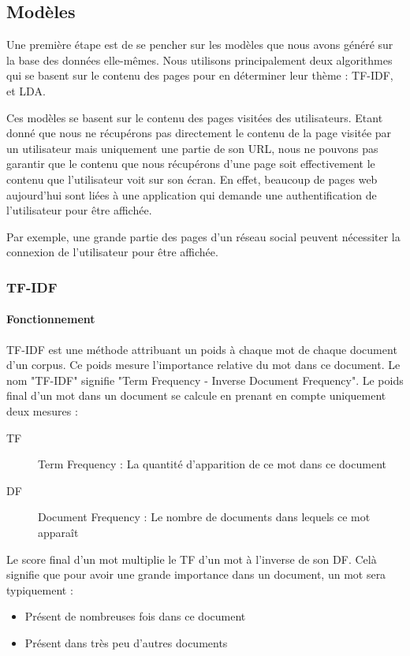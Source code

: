 	\subsection{Modèles}

		Une première étape est de se pencher sur les modèles que nous avons généré sur la base des données elle-mêmes. Nous utilisons principalement deux algorithmes qui se basent sur le contenu des pages pour en déterminer leur thème : TF-IDF, et LDA.

		Ces modèles se basent sur le contenu des pages visitées des utilisateurs. Etant donné que nous ne récupérons pas directement le contenu de la page visitée par un utilisateur mais uniquement une partie de son URL, nous ne pouvons pas garantir que le contenu que nous récupérons d'une page soit effectivement le contenu que l'utilisateur voit sur son écran. En effet, beaucoup de pages web aujourd'hui sont liées à une application qui demande une authentification de l'utilisateur pour être affichée.

		Par exemple, une grande partie des pages d'un réseau social peuvent nécessiter la connexion de l'utilisateur pour être affichée.

		\subsubsection{TF-IDF}

			\paragraph{Fonctionnement}

				TF-IDF est une méthode attribuant un poids à chaque mot de chaque document d'un corpus. Ce poids mesure l'importance relative du mot dans ce document. Le nom "TF-IDF" signifie "Term Frequency - Inverse Document Frequency". Le poids final d'un mot dans un document se calcule en prenant en compte uniquement deux mesures :
				\begin{description}
					\item[TF] Term Frequency : La quantité d'apparition de ce mot dans ce document
					\item[DF] Document Frequency : Le nombre de documents dans lequels ce mot apparaît
				\end{description}

				Le score final d'un mot multiplie le TF d'un mot à l'inverse de son DF. Celà signifie que pour avoir une grande importance dans un document, un mot sera typiquement :
				\begin{itemize}
					\item Présent de nombreuses fois dans ce document
					\item Présent dans très peu d'autres documents
				\end{itemize}

